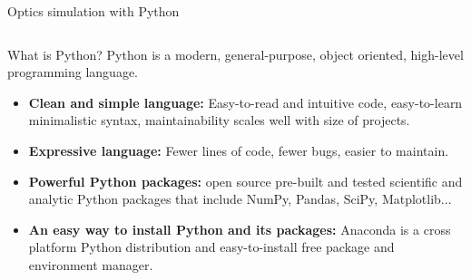 \documentclass[9pt]{beamer}
\begin{document}
\begin{frame}{Optics simulation with Python}
\begin{columns}[c]
	\begin{column}{0.6\textwidth}
		\begin{block}{What is Python?}
			Python is a modern, general-purpose, object oriented, high-level programming language.
			\begin{itemize}
				\item \textbf{Clean and simple language:} Easy-to-read and intuitive code, easy-to-learn minimalistic syntax, maintainability scales well with size of projects.
				\item \textbf{Expressive language:} Fewer lines of code, fewer bugs, easier to maintain.
				\item \textbf{Powerful Python packages:} open source pre-built and tested scientific and
				analytic Python packages that include NumPy, Pandas, SciPy, Matplotlib...
				\item \textbf{An easy way to install Python and its packages:} Anaconda is a cross platform Python distribution and easy-to-install free package and environment manager.
			\end{itemize}
		\end{block}
		
	\end{column}
	

\end{columns}
\end{frame}
\end{document}
